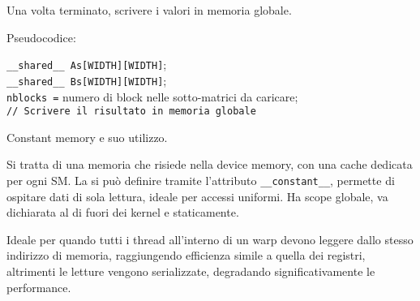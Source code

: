 \begin{questions}
\begin{solution}
    	Una volta terminato, scrivere i valori in memoria globale.
    	
    	Pseudocodice:
    	\begin{center}
    		\begin{minipage}{.9\textwidth}
    			\begin{tcolorbox}[
    				colback=white,
    				sharp corners,
    				boxrule=.3mm,
    				left=20pt,
    				top=0pt,
    				bottom=0pt,
    				colbacktitle=white,
    				coltitle=black
    				]
    				\LinesNumbered
    				\begin{algorithm}[H]
    					\SetAlgoNoEnd
    					\texttt{\_\_shared\_\_ As[WIDTH][WIDTH]}; \\
    					\texttt{\_\_shared\_\_ Bs[WIDTH][WIDTH]}; \\
    					\texttt{nblocks =} numero di block nelle sotto-matrici da caricare; \\
    					\texttt{// Scrivere il risultato in memoria globale}
    				\end{algorithm}
    			\end{tcolorbox}
    		\end{minipage}
    	\end{center}
    \end{solution}
    
    \question Constant memory e suo utilizzo.
    
    \begin{solution}
        Si tratta di una memoria che risiede nella device memory, con una cache dedicata per ogni SM. La si può definire tramite l'attributo \texttt{\_\_constant\_\_}, permette di ospitare dati di sola lettura, ideale per accessi uniformi. Ha scope globale, va dichiarata al di fuori dei kernel e staticamente.
        
        Ideale per quando tutti i thread all'interno di un warp devono leggere dallo stesso indirizzo di memoria, raggiungendo efficienza simile a quella dei registri, altrimenti le letture vengono serializzate, degradando significativamente le performance.
        

\end{solution}
\end{questions}

